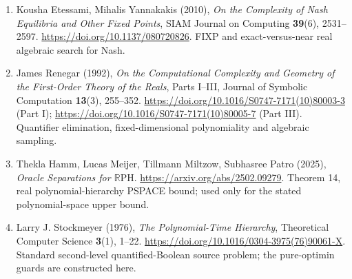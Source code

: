 \documentclass[11pt,a4paper]{article}
\begin{document}
\begin{enumerate}[leftmargin=2.75em,itemsep=4pt]
\item[S7] Kousha Etessami, Mihalis Yannakakis (2010), \emph{On the Complexity of Nash Equilibria and Other Fixed Points}, SIAM Journal on Computing \textbf{39}(6), 2531--2597. \url{https://doi.org/10.1137/080720826}. FIXP and exact-versus-near real algebraic search for Nash.
\item[S8] James Renegar (1992), \emph{On the Computational Complexity and Geometry of the First-Order Theory of the Reals}, Parts I--III, Journal of Symbolic Computation \textbf{13}(3), 255--352. \url{https://doi.org/10.1016/S0747-7171(10)80003-3} (Part I); \url{https://doi.org/10.1016/S0747-7171(10)80005-7} (Part III). Quantifier elimination, fixed-dimensional polynomiality and algebraic sampling.
\item[S9] Thekla Hamm, Lucas Meijer, Tillmann Miltzow, Subhasree Patro (2025), \emph{Oracle Separations for $\mathbb R\mathrm{PH}$}. \url{https://arxiv.org/abs/2502.09279}. Theorem 14, real polynomial-hierarchy PSPACE bound; used only for the stated polynomial-space upper bound.
\item[S10] Larry J. Stockmeyer (1976), \emph{The Polynomial-Time Hierarchy}, Theoretical Computer Science \textbf{3}(1), 1--22. \url{https://doi.org/10.1016/0304-3975(76)90061-X}. Standard second-level quantified-Boolean source problem; the pure-optimin guards are constructed here.
\end{enumerate}
\end{document}
